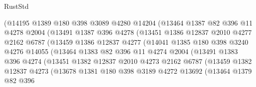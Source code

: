 \begin{lexlean}{RustStd}
\begin{coremodule}
                    (@14195
                      @1389
                      @180
                      @398
                      @3089
                      @4280
                      @14204
                      (@13464
                        @1387
                        @82
                        @396
                        @11
                        @4278
                        @2004
                        (@13491
                          @1387
                          @396
                          @4278
                          (@13451
                            @1386
                            @12837
                            @2010
                            @4277
                            @2162
                            @6787
                            (@13459
                              @1386
                              @12837
                              @4277
                              (@14041
                                @1385
                                @180
                                @398
                                @3240
                                @4276
                                @14055
                                (@13464
                                  @1383
                                  @82
                                  @396
                                  @11
                                  @4274
                                  @2004
                                  (@13491
                                    @1383
                                    @396
                                    @4274
                                    (@13451
                                      @1382
                                      @12837
                                      @2010
                                      @4273
                                      @2162
                                      @6787
                                      (@13459
                                        @1382
                                        @12837
                                        @4273
                                        (@13678
                                          @1381
                                          @180
                                          @398
                                          @3189
                                          @4272
                                          @13692
                                          (@13464
                                            @1379
                                            @82
                                            @396

\end{coremodule}
\end{lexlean}
